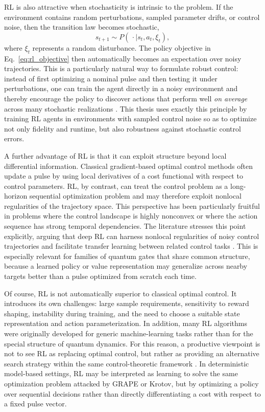 RL is also attractive when stochasticity is intrinsic to the problem. If the environment contains random perturbations, sampled parameter drifts, or control noise, then the transition law becomes stochastic,
\begin{equation}
s_{t+1} \sim P(\,\cdot \mid s_t,a_t,\xi_t),
\label{eq:stochastic_transition_rl}
\end{equation}
where $\xi_t$ represents a random disturbance. The policy objective in Eq.~\eqref{eq:rl_objective} then automatically becomes an expectation over noisy trajectories. This is a particularly natural way to formulate robust control: instead of first optimizing a nominal pulse and then testing it under perturbations, one can train the agent directly in a noisy environment and thereby encourage the policy to discover actions that perform well \emph{on average} across many stochastic realizations \cite{Niu2019}. 
This thesis uses exactly this principle by training RL agents in environments with sampled control noise so as to optimize not only fidelity and runtime, but also robustness against stochastic control errors.

A further advantage of RL is that it can exploit structure beyond local differential information. Classical gradient-based optimal control methods often update a pulse by using local derivatives of a cost functional with respect to control parameters. RL, by contrast, can treat the control problem as a long-horizon sequential optimization problem and may therefore exploit nonlocal regularities of the trajectory space. This perspective has been particularly fruitful in problems where the control landscape is highly nonconvex or where the action sequence has strong temporal dependencies. The literature stresses this point explicitly, arguing that deep RL can harness nonlocal regularities of noisy control trajectories and facilitate transfer learning between related control tasks \cite{Niu2019}. This is especially relevant for families of quantum gates that share common structure, because a learned policy or value representation may generalize across nearby targets better than a pulse optimized from scratch each time.

Of course, RL is not automatically superior to classical optimal control. It introduces its own challenges: large sample requirements, sensitivity to reward shaping, instability during training, and the need to choose a suitable state representation and action parameterization. In addition, many RL algorithms were originally developed for generic machine-learning tasks rather than for the special structure of quantum dynamics. For this reason, a productive viewpoint is not to see RL as replacing optimal control, but rather as providing an alternative search strategy within the same control-theoretic framework \cite{Giannelli2022,Bukov2018}. In deterministic model-based settings, RL may be interpreted as learning to solve the same optimization problem attacked by GRAPE or Krotov, but by optimizing a policy over sequential decisions rather than directly differentiating a cost with respect to a fixed pulse vector.

